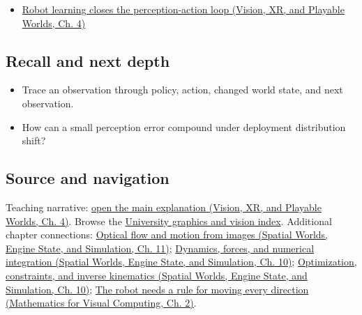 \begin{itemize}
\tightlist
\item
  \href{../07-Vision-XR-and-Playable-Worlds/main.pdf\#nameddest=04-visual-computing-ii-ch034-robot-learning-closes-the-perception-action-loop}{Robot learning closes the perception-action loop (Vision, XR, and Playable Worlds, Ch. 4)}
\end{itemize}

\subsection{Recall and next depth}\label{appendix-b0c42da325f1-recall-and-next-depth}

\hypertarget{appendix-b0c42da325f1-recall-and-next-depth}{}

\begin{itemize}
\tightlist
\item
  Trace an observation through policy, action, changed world state, and next observation.
\item
  How can a small perception error compound under deployment distribution shift?
\end{itemize}

\subsection{Source and navigation}\label{appendix-b0c42da325f1-source-and-navigation}

\hypertarget{appendix-b0c42da325f1-source-and-navigation}{}

Teaching narrative: \href{../07-Vision-XR-and-Playable-Worlds/main.pdf\#nameddest=04-visual-computing-ii-ch034-robot-learning-closes-the-perception-action-loop}{open the main explanation (Vision, XR, and Playable Worlds, Ch. 4)}. Browse the \hyperref[appendix-a6d556a4ef50-university-graphics-vision-and-photography---independent-series]{University graphics and vision index}. Additional chapter connections: \href{../05-Spatial-Worlds-Engine-State-and-Simulation/main.pdf\#nameddest=04-visual-computing-ii-ch030-optical-flow-and-motion-from-images}{Optical flow and motion from images (Spatial Worlds, Engine State, and Simulation, Ch. 11)}; \href{../05-Spatial-Worlds-Engine-State-and-Simulation/main.pdf\#nameddest=04-visual-computing-ii-ch029-dynamics-forces-and-numerical-integration}{Dynamics, forces, and numerical integration (Spatial Worlds, Engine State, and Simulation, Ch. 10)}; \href{../05-Spatial-Worlds-Engine-State-and-Simulation/main.pdf\#nameddest=04-visual-computing-ii-ch029-optimization-constraints-and-inverse-kinematics}{Optimization, constraints, and inverse kinematics (Spatial Worlds, Engine State, and Simulation, Ch. 10)}; \href{../02-Mathematics-for-Visual-Computing/main.pdf\#nameddest=01-foundations-i-ch018-the-robot-needs-a-rule-for-moving-every-direction}{The robot needs a rule for moving every direction (Mathematics for Visual Computing, Ch. 2)}.

